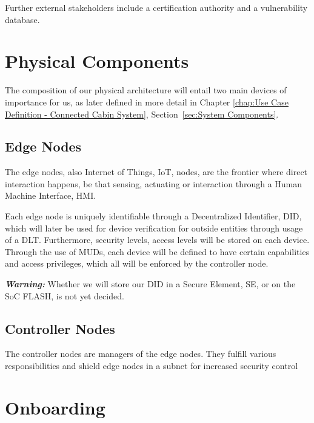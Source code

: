 Further external stakeholders include a certification authority and a vulnerability database.

\section{Physical Components} %
\label{sec:Physical Components}

The composition of our physical architecture will entail two main devices of importance for us, as later defined in more
detail in Chapter \ref{chap:Use Case Definition - Connected Cabin System}, Section~\ref{sec:System Components}.


\subsection{Edge Nodes} %
\label{sec:Edge Nodes}
The edge nodes, also Internet of Things, IoT, nodes, are the frontier where direct interaction happens, be that sensing,
actuating or interaction through a Human Machine Interface, HMI.

Each edge node is uniquely identifiable through a Decentralized Identifier, DID, which will later be used for device
verification for outside entities through usage of a DLT. Furthermore, security levels, access levels will be stored on
each device. Through the use of MUDs, each device will be defined to have certain capabilities and access privileges,
which all will be enforced by the controller node.

\textbf{\textit{Warning:}} Whether we will store our DID in a Secure Element, SE, or on the SoC FLASH, is not yet decided.

\subsection{Controller Nodes} %
\label{sub:Controller Nodes}
The controller nodes are managers of the edge nodes. They fulfill various responsibilities and shield edge nodes in a
subnet for increased security control


\section{Onboarding} %

